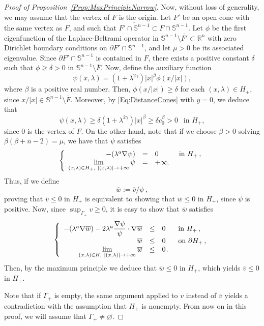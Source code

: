 \documentclass[12pt,reqno]{amsart}
\theoremstyle{definition}
\theoremstyle{remark}
\newcommand{\con}[1]{\mathbb{#1}}
\newcommand{\R}{\con{R}} %
\newcommand{\Sph}{\con{S}} %
\newcommand{\s}{\gamma}
\newcommand\beqc[1]{\left\{\begin{array}{#1}}
\newcommand\eeqc{\end{array} \right.}
\def\PDEsystem{rcll}
\let\div\relax
\DeclareMathOperator{\div}{div}
\def\ds{\displaystyle}
\numberwithin{equation}{section}
\begin{document}
\begin{proof}[Proof of Proposition~\ref{Prop:MaxPrincipleNarrow}]
	Now, without loss of generality, we may assume that the vertex of $F$ is the origin. Let $F'$ be an open cone with the same vertex as $F$, and such that $\overline{F'\cap \Sph^{n-1}} \subset F\cap \Sph^{n-1}$. Let $\phi$ be the first eigenfunction of the Laplace-Beltrami operator in $\Sph^{n-1} \setminus \overline{F'}\subset \R^n$ with zero Dirichlet boundary conditions on $\partial F' \cap \Sph^{n-1}$, and let $\mu>0$ be its associated eigenvalue. Since $\partial F' \cap \Sph^{n-1}$ is contained in $F$, there exists a positive constant $\delta$ such that $\phi\geq \delta > 0$ in $\Sph^{n-1} \setminus \overline{F}$. Now, define the auxiliary function
	$$ 
	\psi(x,\lambda) = (1+\lambda^{2\s}) |x|^\beta \phi(x/|x|), 
	$$
	where $\beta$ is a positive real number. Then, $\phi(x/|x|)\geq \delta$ for each $(x,\lambda) \in H_+$,  since $x/|x| \in \Sph^{n-1} \setminus \overline{F}$. Moreover, by \eqref{Eq:DistanceCones} with $y=0$, we deduce that
	$$ 
	\psi(x,\lambda) \geq \delta (1+\lambda^{2\s}) |x|^\beta \geq \delta c_0^\beta > 0 \ \ \text{ in } H_+,
	$$
	since $0$ is the vertex of $F$.
	On the other hand, note that if we choose $\beta>0$ solving $\beta(\beta+n-2)=\mu$, we have that $\psi$ satisfies
	$$
	\beqc{\PDEsystem}
	-\div(\lambda^a \nabla \psi) &=& 0 & \text{ in } H_+\,, \\
	\ds \lim_{(x,\lambda)\in H_+, \ |(x,\lambda)|\to +\infty} \psi & = & +\infty.
	\eeqc
	$$
	Thus, if we define 
	$$\overline{w}:=\overline{v}/\psi\,,$$
	proving that $\overline{v} \leq 0$ in $H_+$ is equivalent to showing that $\overline{w}\leq 0$ in $H_+$, since $\psi$ is positive. Now, since $\sup_{\Gamma_+} v \geq 0$, it is easy to show that $\overline{w}$ satisfies
	\begin{equation}
	\label{Eq:wTildeEquationNarrow}
	\beqc{\PDEsystem}
	-\div(\lambda^a \nabla \overline{w})-2\lambda^a\dfrac{\nabla \psi}{\psi}\cdot\nabla \overline{w} &\leq& 0 & \text{ in } H_+\,, \\
	\overline{w} &\leq& 0 & \text{ on } \partial H_+\,, \\
	\ds \lim_{(x,\lambda)\in H, \ |(x,\lambda)|\to +\infty} \overline{w} & \leq & 0\,.
	\eeqc
	\end{equation}
	Then, by the maximum principle we deduce that $\overline{w}\leq 0$ in $H_+$, which yields $\overline{v}\leq 0$ in $H_+$.
	
	Note that if $\Gamma_+$ is empty, the same argument applied to $v$ instead of $\overline{v}$ yields a contradiction with the assumption that $H_+$ is nonempty. From now on in this proof, we will assume that $\Gamma_+ \neq \varnothing$.
	

\end{proof}
\end{document}
